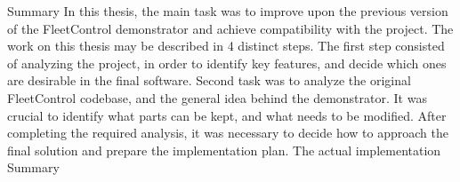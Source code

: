 \chap Summary
In this thesis, the main task was to improve upon the previous version of the FleetControl demonstrator and achieve compatibility with the {\mapfIR} project. 
The work on this thesis may be described in 4 distinct steps.\br
The first step consisted of analyzing the {\mapfIR} project, in order to identify key features, and decide which ones are desirable in the final software.
\br
Second task was to analyze the original FleetControl codebase, and the general idea behind the demonstrator. It was crucial to identify what parts can be kept, and what needs to be modified.
\br
After completing the required analysis, it was necessary to decide how to approach the final solution and prepare the implementation plan.
\br
The actual implementation
\br
Summary
 